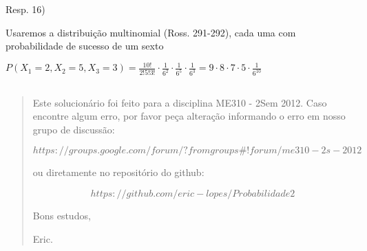 \documentclass[english]{article}
\begin{document}
Resp. 16)

Usaremos a distribuição multinomial (Ross. 291-292), cada uma com
probabilidade de sucesso de um sexto

$P(X_{1}=2,X_{2}=5,X_{3}=3)=\frac{10!}{2!5!3!}\cdot\frac{1}{6^{2}}\cdot\frac{1}{6^{5}}\cdot\frac{1}{6^{3}}=9\cdot8\cdot7\cdot5\cdot\frac{1}{6^{10}}$


\subsection*{\textcompwordmark{}}


\subsection*{\pagebreak{}}
\begin{quotation}
Este solucionário foi feito para a disciplina ME310 - 2Sem 2012. Caso
encontre algum erro, por favor peça alteração informando o erro em
nosso grupo de discussão: 

$$https://groups.google.com/forum/?fromgroups\#!forum/me310-2s-2012$$

ou diretamente no repositório do github:

$$https://github.com/eric-lopes/Probabilidade2$$

Bons estudos,

Eric.\end{quotation}
\end{document}
